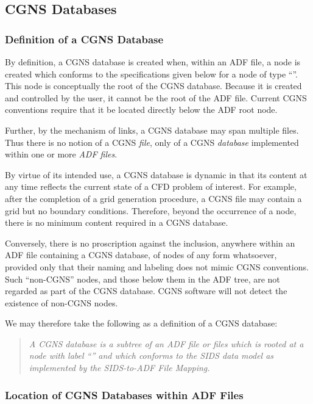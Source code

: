 \subsection{CGNS Databases}
\label{s:cgns_databases}

\subsubsection{Definition of a CGNS Database}

By definition, a CGNS database is created when, within an ADF file, a
node is created which conforms to the specifications given below for a
node of type ``''. This node is conceptually the root
of the CGNS database. Because it is created and controlled by the user,
it cannot be the root of the ADF file.
Current CGNS conventions require that it be located directly below
the ADF root node.

Further, by the mechanism of links, a CGNS database may span multiple
files. Thus there is no notion of a CGNS \emph{file}, only of a CGNS
\emph{database} implemented within one or more \emph{ADF files}.

By virtue of its intended use, a CGNS database is dynamic in
that its content at any time reflects the current state of a CFD
problem of interest. For example, after the completion of a grid
generation procedure, a CGNS file may contain a grid but no boundary
conditions. Therefore, beyond the occurrence of a 
node, there is no minimum content required in a CGNS database.

Conversely, there is no proscription against the inclusion, anywhere
within an ADF file containing a CGNS database, of nodes of any form
whatsoever, provided only that their naming and labeling does not mimic
CGNS conventions. Such ``non-CGNS'' nodes, and those below them in the ADF
tree, are not regarded as part of the CGNS database. CGNS software will
not detect the existence of non-CGNS nodes.

We may therefore take the following as a definition of a CGNS database:
\begin{quote}\itshape%
A CGNS database is a subtree of an ADF file or files which is rooted at
a node with label ``'' and which conforms to the SIDS data
model as implemented by the SIDS-to-ADF File Mapping.
\end{quote}

\subsubsection{Location of CGNS Databases within ADF Files}

